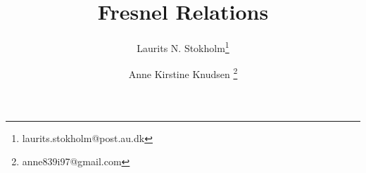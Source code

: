 \documentclass[a4paper, 11pt, twocolumn, oneside]{memoir}
\title{Fresnel Relations}
\author{Laurits N. Stokholm\thanks{laurits.stokholm@post.au.dk} \and Anne Kirstine Knudsen \thanks{anne839i97@gmail.com}}
\date{}
\begin{document}
\maketitle
\noindent








%

\end{document}

